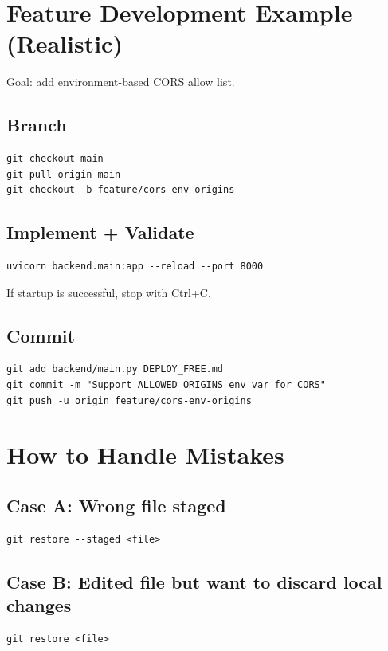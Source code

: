 \documentclass[11pt,a4paper]{article}
\begin{document}
\section{Feature Development Example (Realistic)}
Goal: add environment-based CORS allow list.

\subsection{Branch}
\begin{Verbatim}[fontsize=\small]
git checkout main
git pull origin main
git checkout -b feature/cors-env-origins
\end{Verbatim}

\subsection{Implement + Validate}
\begin{Verbatim}[fontsize=\small]
uvicorn backend.main:app --reload --port 8000
\end{Verbatim}

If startup is successful, stop with Ctrl+C.

\subsection{Commit}
\begin{Verbatim}[fontsize=\small]
git add backend/main.py DEPLOY_FREE.md
git commit -m "Support ALLOWED_ORIGINS env var for CORS"
git push -u origin feature/cors-env-origins
\end{Verbatim}

\section{How to Handle Mistakes}
\subsection{Case A: Wrong file staged}
\begin{Verbatim}[fontsize=\small]
git restore --staged <file>
\end{Verbatim}

\subsection{Case B: Edited file but want to discard local changes}
\begin{Verbatim}[fontsize=\small]
git restore <file>
\end{Verbatim}
\end{document}
